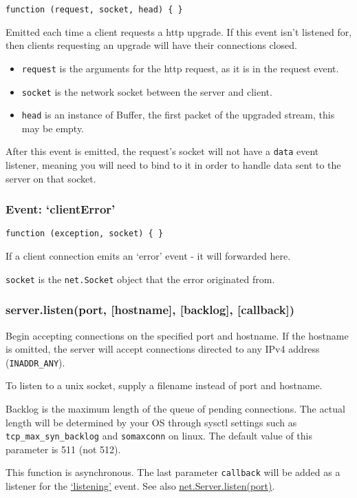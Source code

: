 \texttt{function (request, socket, head) \{ \}}

Emitted each time a client requests a http upgrade. If this event isn't
listened for, then clients requesting an upgrade will have their
connections closed.

\begin{itemize}
\item
  \texttt{request} is the arguments for the http request, as it is in
  the request event.
\item
  \texttt{socket} is the network socket between the server and client.
\item
  \texttt{head} is an instance of Buffer, the first packet of the
  upgraded stream, this may be empty.
\end{itemize}

After this event is emitted, the request's socket will not have a
\texttt{data} event listener, meaning you will need to bind to it in
order to handle data sent to the server on that socket.

\subsubsection{Event: `clientError'}

\texttt{function (exception, socket) \{ \}}

If a client connection emits an `error' event - it will forwarded here.

\texttt{socket} is the \texttt{net.Socket} object that the error
originated from.

\subsubsection{server.listen(port, {[}hostname{]}, {[}backlog{]},
{[}callback{]})}

Begin accepting connections on the specified port and hostname. If the
hostname is omitted, the server will accept connections directed to any
IPv4 address (\texttt{INADDR\_ANY}).

To listen to a unix socket, supply a filename instead of port and
hostname.

Backlog is the maximum length of the queue of pending connections. The
actual length will be determined by your OS through sysctl settings such
as \texttt{tcp\_max\_syn\_backlog} and \texttt{somaxconn} on linux. The
default value of this parameter is 511 (not 512).

This function is asynchronous. The last parameter \texttt{callback} will
be added as a listener for the
\href{net.html\#net\_event\_listening}{`listening'} event. See also
\href{net.html\#net\_server\_listen\_port\_host\_backlog\_callback}{net.Server.listen(port)}.

